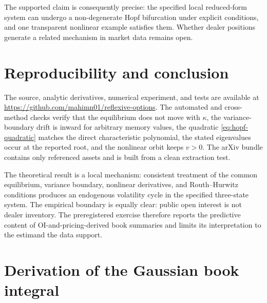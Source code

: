 \documentclass[11pt]{article}
\begin{document}
The supported claim is consequently precise: the specified local reduced-form system can
undergo a non-degenerate Hopf bifurcation under explicit conditions, and one transparent
nonlinear example satisfies them.  Whether dealer positions generate a related mechanism in
market data remains open.

\section{Reproducibility and conclusion}
\label{sec:conclusion}

The source, analytic derivatives, numerical experiment, and tests are available at
\url{https://github.com/mahimn01/reflexive-options}.  The automated and cross-method checks
verify that the equilibrium does not move with $\kappa$, the variance-boundary drift is
inward for arbitrary memory values, the quadratic \eqref{eq:hopf-quadratic} matches the
direct characteristic polynomial, the stated eigenvalues occur at the reported root, and
the nonlinear orbit keeps $v>0$.  The arXiv bundle contains only referenced assets and is
built from a clean extraction test.

The theoretical result is a local mechanism: consistent treatment of the common equilibrium,
variance boundary, nonlinear derivatives, and Routh--Hurwitz conditions produces an
endogenous volatility cycle in the specified three-state system.  The empirical boundary is
equally clear: public open interest is not dealer inventory.  The preregistered exercise
therefore reports the predictive content of OI-and-pricing-derived book summaries and limits
its interpretation to the estimand the data support.

\appendix
\section{Derivation of the Gaussian book integral}
\label{app:book-integral}
\end{document}
